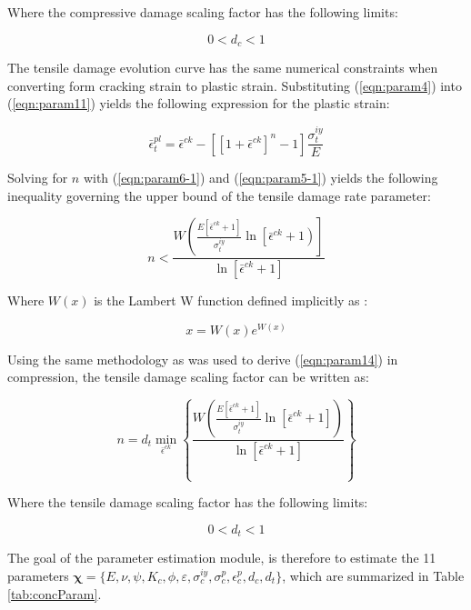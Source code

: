 Where the compressive damage scaling factor has the following limits:

\begin{equation}
0<d_{c}<1\label{eqn:param15}
\end{equation}

The tensile damage evolution curve has the same numerical constraints when converting form cracking strain to plastic strain. Substituting (\ref{eqn:param4}) into (\ref{eqn:param11}) yields the following expression for the plastic strain:

\begin{equation}
\bar{\epsilon}_{t}^{pl}=\bar{\epsilon}^{ck}-\left[\left[1+\bar{\epsilon}^{ck}\right]^{n}-1\right]\frac{\sigma_{t}^{iy}}{E}\label{eqn:param5-1}
\end{equation}

Solving for $n$ with (\ref{eqn:param6-1}) and (\ref{eqn:param5-1}) yields the following inequality governing the upper bound of the tensile damage rate parameter:

\begin{equation}
n<\frac{W\left(\frac{E\left[\bar{\epsilon}^{ck}+1\right]}{\sigma_{t}^{iy}}\ln\left[\bar{\epsilon}^{ck}+1\right)\right]}{\ln\left[\bar{\epsilon}^{ck}+1\right]}\label{eqn:param7}
\end{equation}

Where $W\left(x\right)$ is the Lambert W function defined implicitly as \citep{Corless_1996}:

\begin{equation}
x=W\left(x\right)e^{W(x)}\label{eqn:param8}
\end{equation}

Using the same methodology as was used to derive (\ref{eqn:param14}) in compression, the tensile damage scaling factor can be written as:

\begin{equation}
n=d_{t}\min_{\bar{\epsilon}^{ck}}\left\{\frac{W\left(\frac{E\left[\bar{\epsilon}^{ck}+1\right]}{\sigma_{t}^{iy}}\ln\left[\bar{\epsilon}^{ck}+1\right]\right)}{\ln\left[\bar{\epsilon}^{ck}+1\right]}\right\}
\label{eqn:param9}
\end{equation}

Where the tensile damage scaling factor has the following limits:

\begin{equation}
0<d_{t}<1\label{eqn:param10}
\end{equation}

The goal of the parameter estimation module, is therefore to estimate the 11 parameters $\boldsymbol{\chi}=\{E,\nu,\psi, K_c, \phi, \varepsilon, \sigma_c^{iy},\allowbreak\sigma_{c}^{p}, \epsilon_c^{p}, d_c, d_t \}$, which are summarized in Table \ref{tab:concParam}.

